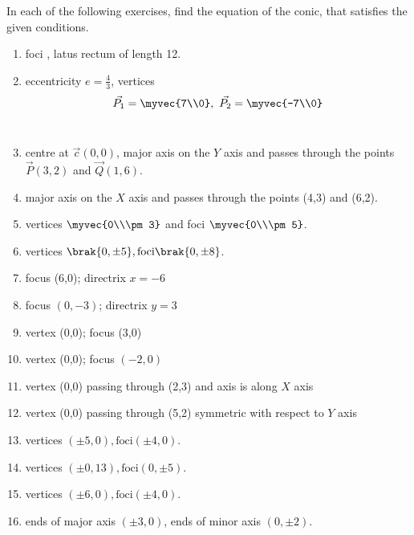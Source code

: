In each of the following exercises, find the equation of the conic, that satisfies the given conditions.

\begin{enumerate}[label=\thesubsection.\arabic*,ref=\thesubsection.\theenumi,resume*]
\item  foci , latus rectum of length 12.
\\
\solution
		
    \item eccentricity $e = \frac{4}{3}$,
    vertices 
    \begin{align}
        \vec{P_1} = \myvec{7\\0},\ \vec{P_2} = \myvec{-7\\0}
        \label{eq:chapters/11/11/4/14/vert}
    \end{align}
\\
\solution
		
\item centre at $\vec{c}(0,0)$, major axis on the $Y$ axis and passes through the points $\vec{P}(3,2)$ and $\vec{Q}(1,6)$.
\\
\solution

\item major axis on the $X$ axis and passes through the points (4,3) and (6,2).
\\
\solution

\item vertices $\myvec{0\\\pm 3}$ and foci $\myvec{0\\\pm5}$.
	\\
\solution
		
\item vertices $\brak{0,\pm 5}, \text{foci} \brak{0,\pm 8}$.  
\item focus (6,0); directrix $x=-6$
\item focus $(0,-3)$; directrix $y=3$
\item vertex (0,0); focus (3,0)
\item vertex (0,0); focus $(-2,0) $
\item vertex (0,0) passing through (2,3) and axis is along $X$ axis
\item vertex (0,0) passing through (5,2) symmetric with respect to $Y$ axis
\item vertices $(\pm5,0),\text{foci} (\pm4,0)$.
\item vertices $(\pm0,13),\text{foci} (0,\pm5)$.
\item vertices $(\pm6,0),\text{foci} (\pm4,0)$.
\item ends of major axis $(\pm3,0)$, ends of minor axis $(0,\pm2)$.

\end{enumerate}
